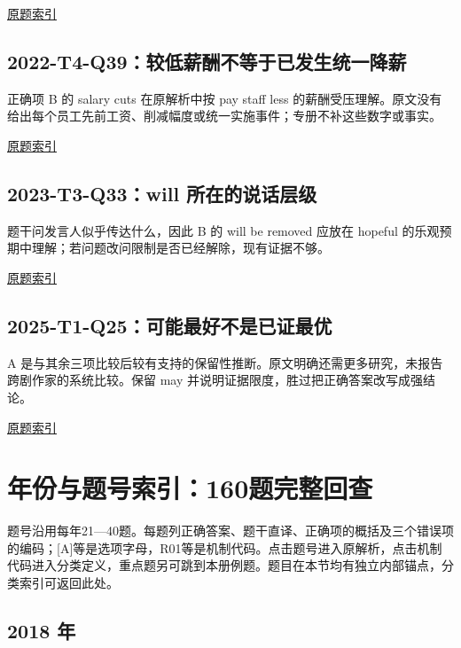 \documentclass[11pt,a4paper]{article}
\begin{document}
\hyperref[idx-2019-T4-Q38]{原题索引}\par
{}
\subsection{2022-T4-Q39：较低薪酬不等于已发生统一降薪}
正确项 B 的 salary cuts 在原解析中按 pay staff less 的薪酬受压理解。原文没有给出每个员工先前工资、削减幅度或统一实施事件；专册不补这些数字或事实。

\hyperref[idx-2022-T4-Q39]{原题索引}\par
{}
\subsection{2023-T3-Q33：will 所在的说话层级}
题干问发言人似乎传达什么，因此 B 的 will be removed 应放在 hopeful 的乐观预期中理解；若问题改问限制是否已经解除，现有证据不够。

\hyperref[idx-2023-T3-Q33]{原题索引}\par
{}
\subsection{2025-T1-Q25：可能最好不是已证最优}
A 是与其余三项比较后较有支持的保留性推断。原文明确还需更多研究，未报告跨剧作家的系统比较。保留 may 并说明证据限度，胜过把正确答案改写成强结论。

\hyperref[idx-2025-T1-Q25]{原题索引}\par
\clearpage\section{年份与题号索引：160题完整回查}\label{year-index}
题号沿用每年21—40题。每题列正确答案、题干直译、正确项的概括及三个错误项的编码；[A]等是选项字母，R01等是机制代码。点击题号进入原解析，点击机制代码进入分类定义，重点题另可跳到本册例题。题目在本节均有独立内部锚点，分类索引可返回此处。

\setlength{\parskip}{1pt}
\subsection{2018 年}\label{year-2018}
\end{document}
